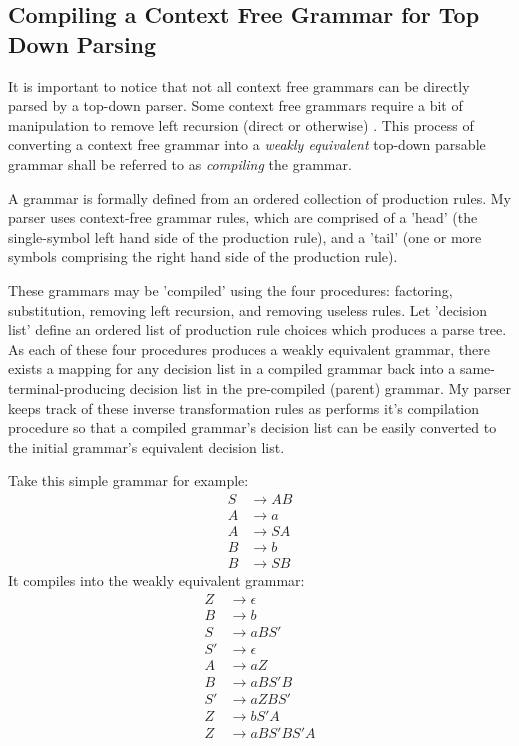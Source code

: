 \documentclass[11pt]{article}
\begin{document}
\clearpage

\subsection{Compiling a Context Free Grammar for Top Down Parsing}

It is important to notice that not all context free grammars can be directly parsed by a
top-down parser. Some context free grammars require a bit of manipulation to remove
left recursion (direct or otherwise) \cite{compiler}. This process of converting a context
free grammar into a {\em weakly equivalent} top-down parsable grammar shall be referred to as
{\em compiling} the grammar.

A grammar is formally defined from an ordered collection of production rules.
My parser uses context-free grammar rules, which are comprised of a
'head' (the single-symbol left hand side of the production rule), and a 'tail'
(one or more symbols comprising the right hand side of the production rule).

These grammars may be 'compiled' using the four procedures:
factoring, substitution, removing left recursion, and removing useless
rules. Let 'decision list' define an ordered list of production rule
choices which produces a parse tree.
As each of these four procedures produces a weakly equivalent grammar,
there exists a mapping for any decision list in a compiled grammar
back into a same-terminal-producing decision list in the pre-compiled (parent) grammar.
My parser keeps track of these inverse transformation rules as performs
it's compilation procedure so that a compiled grammar's decision list can be easily
converted to the initial grammar's equivalent decision list. 

Take this simple grammar for example:
\setcounter{equation}{0}
\begin{align}
S &\rightarrow A B\\
A &\rightarrow a\\
A &\rightarrow S A\\
B &\rightarrow b\\
B &\rightarrow S B
\end{align}
It compiles into the weakly equivalent grammar:
\setcounter{equation}{0}
\begin{align}
Z &\rightarrow \epsilon\\
B &\rightarrow b\\
S &\rightarrow a B S'\\
S' &\rightarrow \epsilon\\
A &\rightarrow a Z\\
B &\rightarrow a B S' B\\
S' &\rightarrow a Z B S'\\
Z &\rightarrow b S' A\\
Z &\rightarrow a B S' B S' A
\end{align}
\end{document}

